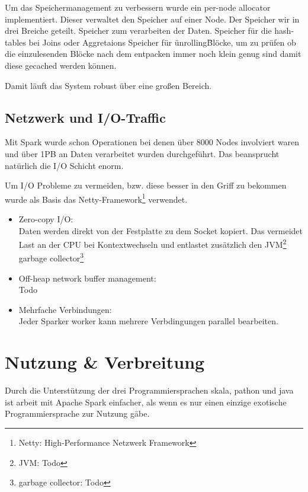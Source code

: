 Um das Speichermanagement zu verbessern wurde ein per-node allocator implementiert. Dieser verwaltet den Speicher auf einer Node. 
Der Speicher wir in drei Breiche geteilt. 
Speicher zum verarbeiten der Daten.  
Speicher für die hash-tables bei Joins oder Aggretaions
Speicher für \"unrolling\" Blöcke, um zu prüfen ob die einzulesenden Blöcke nach dem entpacken immer noch klein genug sind damit diese gecached werden können.

Damit läuft das System robust über eine großen Bereich. 

\subsection{Netzwerk und I/O-Traffic}

Mit Spark wurde schon Operationen bei denen über 8000 Nodes involviert waren und über 1PB an Daten verarbeitet wurden durchgeführt.
Das beansprucht natürlich die I/O Schicht enorm. 


Um I/O Probleme zu vermeiden, bzw. diese besser in den Griff zu bekommen wurde als Basis das Netty-Framework\footnote{Netty: High-Performance Netzwerk Framework} verwendet.
\begin{itemize}
	\item Zero-copy I/O:\\
	Daten werden direkt von der Festplatte zu dem Socket kopiert. Das vermeidet Last an der CPU bei Kontextwechseln und entlastet zusätzlich den JVM\footnote{JVM: Todo} garbage collector\footnote{garbage collector: Todo}
	\item Off-heap network buffer management:\\
	Todo
	\item Mehrfache Verbindungen:\\
	Jeder Sparker worker kann mehrere Verbdingungen parallel bearbeiten.
\end{itemize}


\newpage
\section{Nutzung \& Verbreitung}

Durch die Unterst\"utzung der drei Programmiersprachen skala, pathon und java ist arbeit mit Apache Spark einfacher, als wenn es nur einen einzige exotische Programmiersprache zur Nutzung g\"abe. \\


